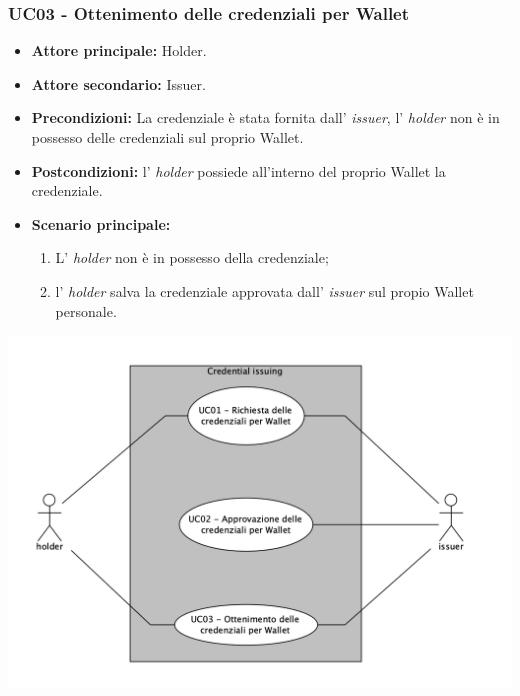 \subsubsection{UC03 - Ottenimento delle credenziali per Wallet}
\begin{itemize}
\item \textbf{Attore principale:} Holder.
\item \textbf{Attore secondario:} Issuer.
\item \textbf{Precondizioni:} La credenziale è stata fornita dall' \textit{issuer}, l' \textit{holder} non è in possesso delle credenziali sul proprio Wallet.
\item \textbf{Postcondizioni:} l' \textit{holder} possiede all’interno del proprio Wallet la credenziale.
\item \textbf{Scenario principale:} 
    \begin{enumerate}
        \item L' \textit{holder} non è in possesso della credenziale;
        \item l' \textit{holder} salva la credenziale approvata dall' \textit{issuer} sul propio Wallet personale.
    \end{enumerate}
\end{itemize}
\begin{center}
    \includegraphics[scale = 0.65]{./res/img/credentialIssuing.png}
\end{center}

